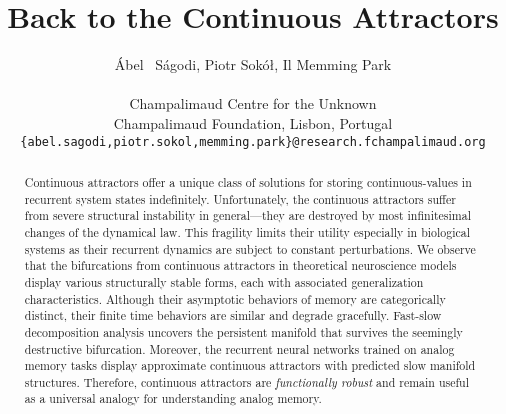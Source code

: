 \documentclass{article} %
\title{Back to the Continuous Attractors}
\author{%
    \'Abel ~S\'agodi, Piotr Sok\'o\l, Il Memming Park \\
    \\
    Champalimaud Centre for the Unknown\\
    Champalimaud Foundation, Lisbon, Portugal\\
    \texttt{\{abel.sagodi,piotr.sokol,memming.park\}@research.fchampalimaud.org} \\
}
\newcounter{ct}
\theoremstyle{definition}
\theoremstyle{remark}
\begin{document}
    

\maketitle

\begin{abstract}
Continuous attractors offer a unique class of solutions for storing continuous-values in recurrent system states indefinitely.
Unfortunately, the continuous attractors suffer from severe structural instability in general---they are destroyed by most infinitesimal changes of the dynamical law.
This fragility limits their utility especially in biological systems as their recurrent dynamics are subject to constant perturbations.
We observe that the bifurcations from continuous attractors in theoretical neuroscience models display various structurally stable forms, each with associated generalization characteristics.
Although their asymptotic behaviors of memory are categorically distinct, their finite time behaviors are similar and degrade gracefully.
Fast-slow decomposition analysis uncovers the persistent manifold that survives the seemingly destructive bifurcation.
Moreover, the recurrent neural networks trained on analog memory tasks display approximate continuous attractors with predicted slow manifold structures.
Therefore, continuous attractors are \emph{functionally robust} and remain useful as a universal analogy for understanding analog memory.
\end{abstract}
\end{document}
